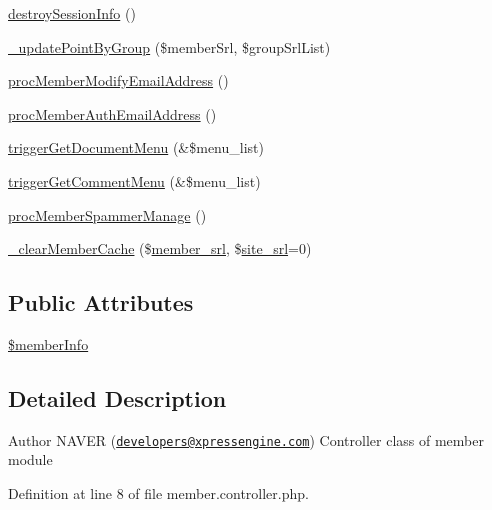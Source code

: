 \begin{DoxyCompactItemize}
\item 
\hyperlink{classmemberController_ac259eb5e2f5ea0b7e747608fa1a308bd}{destroy\+Session\+Info} ()
\item 
\hyperlink{classmemberController_abe9b21621506198b75656781e6919dba}{\+\_\+update\+Point\+By\+Group} (\$member\+Srl, \$group\+Srl\+List)
\item 
\hyperlink{classmemberController_ac5954a875ecc954379437d5c7762fdfe}{proc\+Member\+Modify\+Email\+Address} ()
\item 
\hyperlink{classmemberController_a7584206ce0ce606173fade04207fb1ea}{proc\+Member\+Auth\+Email\+Address} ()
\item 
\hyperlink{classmemberController_a4f6ca6a2a8db362cac531920762a94f9}{trigger\+Get\+Document\+Menu} (\&\$menu\+\_\+list)
\item 
\hyperlink{classmemberController_aa97406ab4da679f7b54cceb404bd563f}{trigger\+Get\+Comment\+Menu} (\&\$menu\+\_\+list)
\item 
\hyperlink{classmemberController_a99f87aecac7ae283cec747a007df88b8}{proc\+Member\+Spammer\+Manage} ()
\item 
\hyperlink{classmemberController_a6b061f30aaaa5c4f1f8da1d52fdb2da9}{\+\_\+clear\+Member\+Cache} (\$\hyperlink{ko_8install_8php_aa61f9e08f0fe505094d26f8143f30bbd}{member\+\_\+srl}, \$\hyperlink{ko_8install_8php_a8b1406b4ad1048041558dce6bfe89004}{site\+\_\+srl}=0)
\end{DoxyCompactItemize}
\subsection*{Public Attributes}
\begin{DoxyCompactItemize}
\item 
\hyperlink{classmemberController_a01868bd628d8e1b39a4256352fccad44}{\$member\+Info}
\end{DoxyCompactItemize}


\subsection{Detailed Description}
\begin{DoxyAuthor}{Author}
N\+A\+V\+E\+R (\href{mailto:developers@xpressengine.com}{\tt developers@xpressengine.\+com}) Controller class of member module 
\end{DoxyAuthor}


Definition at line 8 of file member.\+controller.\+php.



